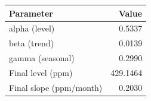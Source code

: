 
\begin{tabular}[t]{lr}
\toprule
Parameter & Value\\
\midrule
alpha (level) & 0.5337\\
beta (trend) & 0.0139\\
gamma (seasonal) & 0.2990\\
Final level (ppm) & 429.1464\\
Final slope (ppm/month) & 0.2030\\
\bottomrule
\end{tabular}
